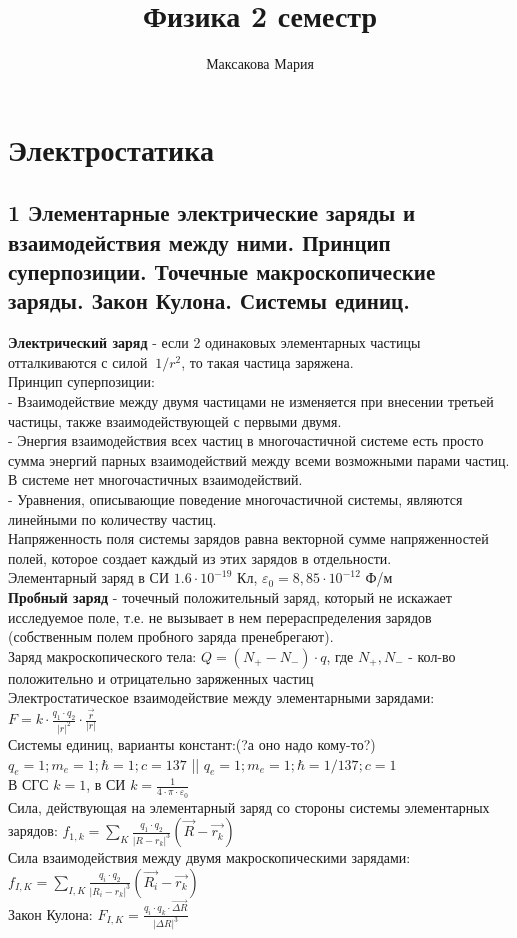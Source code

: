 \documentclass[a4paper,12pt]{article}
\author{Максакова Мария}
\title{Физика 2 семестр}
\begin{document}
\section{Электростатика}
\subsection{1   Элементарные электрические заряды и взаимодействия между ними. Принцип суперпозиции. Точечные макроскопические заряды. Закон Кулона. Системы единиц. }
\textbf{Электрический заряд} - если 2 одинаковых элементарных частицы отталкиваются с силой $~1/r^2$, то такая частица заряжена.\\
Принцип суперпозиции:\\
 - Взаимодействие между двумя частицами не изменяется при внесении третьей частицы, также взаимодействующей с первыми двумя.\\
 - Энергия взаимодействия всех частиц в многочастичной системе есть просто сумма энергий парных взаимодействий между всеми возможными парами частиц. В системе нет многочастичных взаимодействий.\\
 - Уравнения, описывающие поведение многочастичной системы, являются линейными по количеству частиц.\\
Напряженность поля системы зарядов равна векторной сумме напряженностей полей, которое создает каждый из этих зарядов в отдельности.\\
Элементарный заряд в СИ $1.6 \cdot 10^{-19}$ Кл, $\varepsilon _0 = 8,85 \cdot 10^{-12}$ Ф/м\\
\textbf{Пробный заряд} - точечный положительный заряд, который не искажает исследуемое поле, т.е. не вызывает в нем перераспределения зарядов (собственным полем пробного заряда пренебрегают).\\
Заряд макроскопического тела: $Q = (N_+ - N_-)\cdot q$, где $N_+, N_-$ - кол-во положительно и отрицательно заряженных частиц\\
Электростатическое взаимодействие между элементарными зарядами: $F = k \cdot \frac{q_1 \cdot q_2}{|r|^2} \cdot \frac{\vec{r}}{|r|}$\\
Системы единиц, варианты констант:(?а оно надо кому-то?)\\
$q_e = 1; m_e = 1; \hbar = 1; c = 137$ || $q_e = 1; m_e = 1; \hbar = 1/137; c = 1$\\
В СГС $k = 1$, в СИ $k =  \frac{1}{4\cdot \pi \cdot \varepsilon _0}$\\
Сила, действующая на элементарный заряд со стороны системы элементарных зарядов: $f_{1,k} = \sum _K \frac{q_1 \cdot q_2}{|R - r_k|^3}(\vec{R} - \vec{r_k})$\\
Сила взаимодействия между двумя макроскопическими зарядами: $f_{I,K} = \sum _{I,K} \frac{q_i \cdot q_2}{|R_i - r_k|^3}(\vec{R_i} - \vec{r_k})$\\
Закон Кулона: $F_{I,K} = \frac{q_i \cdot q_k \cdot \vec{\Delta R}}{|\Delta R|^3}$\\
\end{document}
